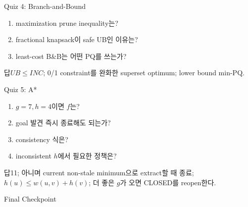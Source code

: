 \begin{frame}{Quiz 4: Branch-and-Bound}
\begin{enumerate}\item maximization prune inequality는?\item fractional knapsack이 safe UB인 이유는?\item least-cost B\&B는 어떤 PQ를 쓰는가?\end{enumerate}
\begin{exampleblock}{답}\(UB\le INC\); 0/1 constraint를 완화한 superset optimum; lower bound min-PQ.\end{exampleblock}
\end{frame}
\begin{frame}{Quiz 5: A*}
\begin{enumerate}\item \(g=7,h=4\)이면 \(f\)는?\item goal 발견 즉시 종료해도 되는가?\item consistency 식은?\item inconsistent \(h\)에서 필요한 정책은?\end{enumerate}
\begin{exampleblock}{답}11; 아니며 current non-stale minimum으로 extract할 때 종료; \(h(u)\le w(u,v)+h(v)\); 더 좋은 \(g\)가 오면 CLOSED를 reopen한다.\end{exampleblock}
\end{frame}
\begin{frame}{Final Checkpoint}
\end{frame}
